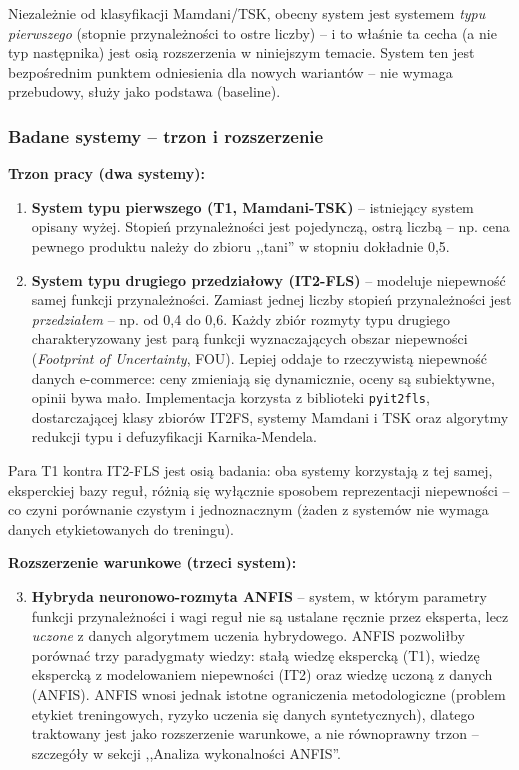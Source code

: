 \documentclass[12pt,a4paper]{article}
\newcommand{\topicsection}[1]{\subsubsection*{#1}}
\begin{document}
Niezależnie od klasyfikacji Mamdani/TSK, obecny system jest systemem \emph{typu pierwszego} (stopnie przynależności to ostre liczby) -- i to właśnie ta cecha (a nie typ następnika) jest osią rozszerzenia w niniejszym temacie. System ten jest bezpośrednim punktem odniesienia dla nowych wariantów -- nie wymaga przebudowy, służy jako podstawa (baseline).

\topicsection{Badane systemy -- trzon i rozszerzenie}
\textbf{Trzon pracy (dwa systemy):}
\begin{enumerate}
\item \textbf{System typu pierwszego (T1, Mamdani-TSK)} -- istniejący system opisany wyżej. Stopień przynależności jest pojedynczą, ostrą liczbą -- np. cena pewnego produktu należy do zbioru ,,tani'' w stopniu dokładnie 0,5.

\item \textbf{System typu drugiego przedziałowy (IT2-FLS)} -- modeluje niepewność samej funkcji przynależności. Zamiast jednej liczby stopień przynależności jest \emph{przedziałem} -- np. od 0,4 do 0,6. Każdy zbiór rozmyty typu drugiego charakteryzowany jest parą funkcji wyznaczających obszar niepewności (\emph{Footprint of Uncertainty}, FOU). Lepiej oddaje to rzeczywistą niepewność danych e-commerce: ceny zmieniają się dynamicznie, oceny są subiektywne, opinii bywa mało. Implementacja korzysta z biblioteki \texttt{pyit2fls}, dostarczającej klasy zbiorów IT2FS, systemy Mamdani i TSK oraz algorytmy redukcji typu i defuzyfikacji Karnika-Mendela.
\end{enumerate}

Para T1 kontra IT2-FLS jest osią badania: oba systemy korzystają z tej samej, eksperckiej bazy reguł, różnią się wyłącznie sposobem reprezentacji niepewności -- co czyni porównanie czystym i jednoznacznym (żaden z systemów nie wymaga danych etykietowanych do treningu).

\textbf{Rozszerzenie warunkowe (trzeci system):}
\begin{enumerate}\setcounter{enumi}{2}
\item \textbf{Hybryda neuronowo-rozmyta ANFIS} -- system, w którym parametry funkcji przynależności i wagi reguł nie są ustalane ręcznie przez eksperta, lecz \emph{uczone} z danych algorytmem uczenia hybrydowego. ANFIS pozwoliłby porównać trzy paradygmaty wiedzy: stałą wiedzę ekspercką (T1), wiedzę ekspercką z modelowaniem niepewności (IT2) oraz wiedzę uczoną z danych (ANFIS). ANFIS wnosi jednak istotne ograniczenia metodologiczne (problem etykiet treningowych, ryzyko uczenia się danych syntetycznych), dlatego traktowany jest jako rozszerzenie warunkowe, a nie równoprawny trzon -- szczegóły w sekcji ,,Analiza wykonalności ANFIS''.
\end{enumerate}
\end{document}
